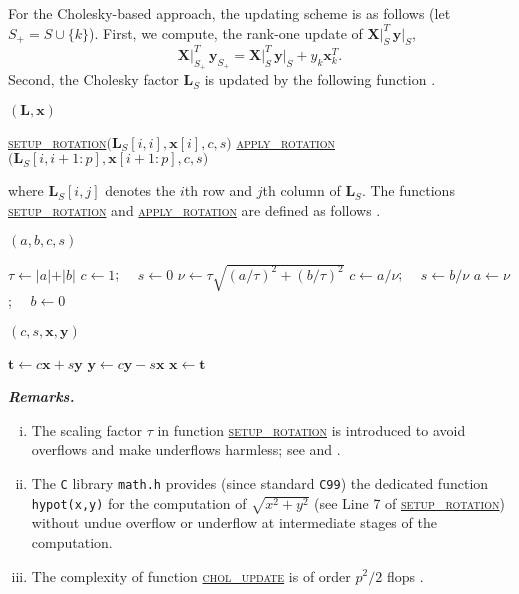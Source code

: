 \documentclass[a4paper,oneside,11pt,DIV=12]{scrartcl}
\newcommand{\code}[1]{{\texttt{#1}}}
\begin{document}
For the Cholesky-based approach, the updating scheme is as follows (let $S_{+} = S \cup \{k\}$). First, we compute, the rank-one update of $\bm X\vert_S^T \, \bm y\vert_S$,
\begin{equation}\label{eq:xtyupdate}
	\bm X\vert_{S_+}^T \, \bm y_{S_+} = \bm X\vert_{S}^T \, \bm y \vert_S + y_k \bm x_k^T.
\end{equation}
\noindent Second, the Cholesky factor $\bm L_S$ is updated by the following function \citep[][p. 340]{stewart_1998}. 
\begin{algorithmic}[1]
	\hypertarget{alg:cholupdate}{$(\bm L, \bm x)$}
		\State  \hyperlink{alg:setuprotation}{\textsc{setup\_rotation}}$\big(\bm L_S[i,i], \bm x[i], c, s\big)$
		\State \hyperlink{alg:applyrotation}{\textsc{apply\_rotation}}$\big(\bm L_S[i, i+1:p], \bm x[i+1:p], c, s\big)$
	\EndFor
	\EndFunction 
\end{algorithmic}
\noindent where $\bm L_S[i,j]$ denotes the $i$th row and $j$th column of $\bm L_S$. The functions \hyperlink{alg:setuprotation}{\textsc{setup\_rotation}} and \hyperlink{alg:applyrotation}{\textsc{apply\_rotation}} are defined as follows \citep[][Algorithms 1.6 and 1.7]{stewart_1998}.
\begin{algorithmic}[1]
	\hypertarget{alg:setuprotation}{$(a,b,c,s)$}
	\State $\tau \gets \vert a \vert + \vert b \vert$
	\If{$\tau \leq \epsilon$}
		\State $c \gets 1$; $\quad s \gets 0$
		\State \Return
	\EndIf
	\State $\nu \gets \tau \sqrt{(a/\tau)^2 + (b/\tau)^2}$
	\State $c \gets a/\nu$; $\quad s \gets b/\nu$
	\State $a \gets \nu$; $\quad b \gets 0$
	\EndFunction
\end{algorithmic}
\begin{algorithmic}[1]
	\hypertarget{alg:applyrotation}{$(c, s, \bm x, \bm y)$}
	\State $\bm t \gets c \bm x + s \bm y$
	\State $\bm y \gets c \bm y - s \bm x$
	\State $\bm x \gets \bm t$
	\EndFunction
\end{algorithmic}

\vspace{1em}
\noindent\textbf{\sffamily \small \itshape Remarks.}
\vspace{-0.5em}
\begin{enumerate}[i)]
	\item The scaling factor $\tau$ in function \hyperlink{alg:setuprotation}{\textsc{setup\_rotation}} is introduced to avoid overflows and make underflows harmless; see \citet[][p. 273]{stewart_1998} and \citet[][Chap. 5.1.8]{golub_loan_1996}. 
	\item The \code{C} library \code{math.h} provides (since standard \code{C99}) the dedicated function \code{hypot(x,y)} for the computation of $\sqrt{x^2 + y^2}$ (see Line 7 of  \hyperlink{alg:setuprotation}{\textsc{setup\_rotation}}) without undue overflow or underflow at intermediate stages of the computation.
	\item The complexity of function \hyperlink{alg:cholupdate}{\textsc{chol\_update}} is of order $p^2/2$ flops \citep[][p. 340]{stewart_1998}. 
\end{enumerate}
\end{document}

